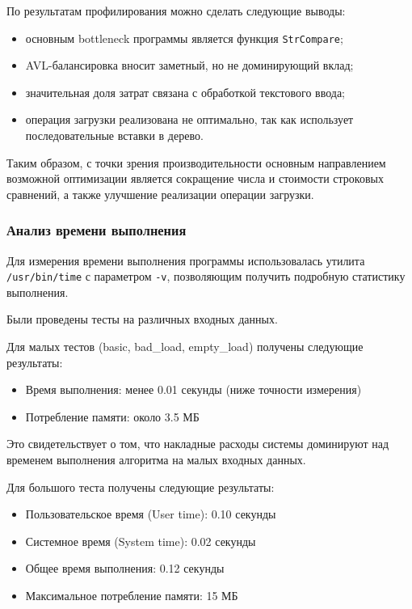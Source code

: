 \documentclass[12pt]{article}
\begin{document}
По результатам профилирования можно сделать следующие выводы:
\begin{itemize}
	\item основным bottleneck программы является функция \texttt{StrCompare};
	\item AVL-балансировка вносит заметный, но не доминирующий вклад;
	\item значительная доля затрат связана с обработкой текстового ввода;
	\item операция загрузки реализована не оптимально, так как использует последовательные вставки в дерево.
\end{itemize}

Таким образом, с точки зрения производительности основным направлением возможной оптимизации является сокращение числа и стоимости строковых сравнений, а также улучшение реализации операции загрузки.

\vspace{1\baselineskip}

\subsubsection*{Анализ времени выполнения}

Для измерения времени выполнения программы использовалась утилита \texttt{/usr/bin/time} с параметром \texttt{-v}, позволяющим получить подробную статистику выполнения.

Были проведены тесты на различных входных данных.

Для малых тестов (basic, bad\_load, empty\_load) получены следующие результаты:
\begin{itemize}
	\item Время выполнения: менее 0.01 секунды (ниже точности измерения)
	\item Потребление памяти: около 3.5 МБ
\end{itemize}

Это свидетельствует о том, что накладные расходы системы доминируют над временем выполнения алгоритма на малых входных данных.

Для большого теста получены следующие результаты:
\begin{itemize}
	\item Пользовательское время (User time): 0.10 секунды
	\item Системное время (System time): 0.02 секунды
	\item Общее время выполнения: 0.12 секунды
	\item Максимальное потребление памяти: 15 МБ
\end{itemize}
\end{document}
